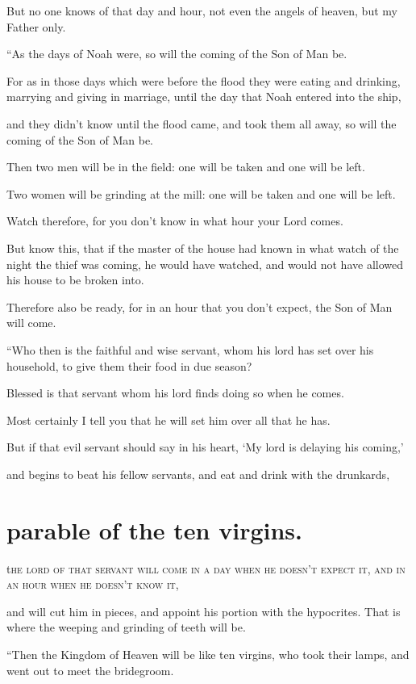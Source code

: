 But no one knows of that day and hour, not even the angels of heaven, but my Father only.

“As the days of Noah were, so will the coming of the Son of Man be.

For as in those days which were before the flood they were eating and drinking, marrying and giving in marriage, until the day that Noah entered into the ship,

and they didn’t know until the flood came, and took them all away, so will the coming of the Son of Man be.

Then two men will be in the field: one will be taken and one will be left.

Two women will be grinding at the mill: one will be taken and one will be left.

Watch therefore, for you don’t know in what hour your Lord comes.

But know this, that if the master of the house had known in what watch of the night the thief was coming, he would have watched, and would not have allowed his house to be broken into.

Therefore also be ready, for in an hour that you don’t expect, the Son of Man will come.

“Who then is the faithful and wise servant, whom his lord has set over his household, to give them their food in due season?

Blessed is that servant whom his lord finds doing so when he comes.

Most certainly I tell you that he will set him over all that he has.

But if that evil servant should say in his heart, ‘My lord is delaying his coming,’

and begins to beat his fellow servants, and eat and drink with the drunkards,


\clearpage \section*{parable of the ten virgins.}

\lettrine{t}{he lord of that servant will come in a day when he doesn’t expect it, and in an hour when he doesn’t know it,}

and will cut him in pieces, and appoint his portion with the hypocrites. That is where the weeping and grinding of teeth will be.

“Then the Kingdom of Heaven will be like ten virgins, who took their lamps, and went out to meet the bridegroom.

